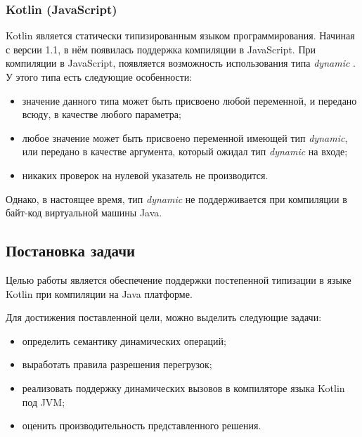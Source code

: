 \subsubsection{Kotlin (JavaScript)}
Kotlin является статически типизированным языком программирования. Начиная с версии 1.1, в нём появилась 
поддержка компиляции в JavaScript. При компиляции в JavaScript, появляется возможность использования типа \textit{dynamic} \cite{kotlin:dynamicType}. У этого типа есть следующие особенности:

\begin{itemize}
    \item значение данного типа может быть присвоено любой переменной, и передано всюду, в качестве любого параметра;
    \item любое значение может быть присвоено переменной имеющей тип \textit{dynamic}, или передано в качестве аргумента, который ожидал тип \textit{dynamic} на входе;
    \item никаких проверок на нулевой указатель не производится.
\end{itemize}

Однако, в настоящее время, тип \textit{dynamic} не поддерживается при компиляции в байт-код виртуальной машины Java.



\subsection{Постановка задачи}

Целью работы является обеспечение поддержки постепенной типизации в языке Kotlin
при компиляции на Java платформе.

Для достижения поставленной цели, можно выделить следующие задачи:
\begin{itemize}
    \item определить семантику динамических операций;
    \item выработать правила разрешения перегрузок;
    \item реализовать поддержку динамических вызовов в компиляторе языка Kotlin под JVM;
    \item оценить производительность представленного решения.
\end{itemize}

